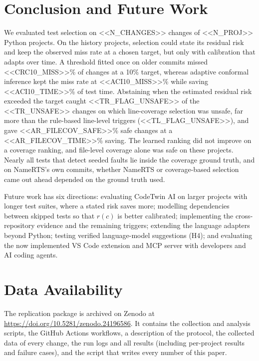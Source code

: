 \documentclass[conference]{IEEEtran}
\begin{document}
\section{Conclusion and Future Work}\label{sec:conclusion}
We evaluated test selection on <<N_CHANGES>> changes of <<N_PROJ>> Python projects. On the history projects, selection could state its residual risk and keep the observed miss rate at a chosen target, but only with calibration that adapts over time. A threshold fitted once on older commits missed <<CRC10_MISS>>\% of changes at a 10\% target, whereas adaptive conformal inference kept the miss rate at <<ACI10_MISS>>\% while saving <<ACI10_TIME>>\% of test time. Abstaining when the estimated residual risk exceeded the target caught <<TR_FLAG_UNSAFE>> of the <<TR_UNSAFE>> changes on which line-coverage selection was unsafe, far more than the rule-based line-level triggers (<<TL_FLAG_UNSAFE>>), and gave <<AR_FILECOV_SAFE>>\% safe changes at a <<AR_FILECOV_TIME>>\% saving. The learned ranking did not improve on a coverage ranking, and file-level coverage alone was safe on these projects. Nearly all tests that detect seeded faults lie inside the coverage ground truth, and on NameRTS's own commits, whether NameRTS or coverage-based selection came out ahead depended on the ground truth used.

Future work has six directions: evaluating CodeTwin AI on larger projects with longer test suites, where a stated risk saves more; modelling dependencies between skipped tests so that $r(c)$ is better calibrated; implementing the cross-repository evidence and the remaining triggers; extending the language adapters beyond Python; testing verified language-model suggestions (H4); and evaluating the now implemented VS Code extension and MCP server with developers and AI coding agents.

\section*{Data Availability}
The replication package is archived on Zenodo at \url{https://doi.org/10.5281/zenodo.24196586}. It contains the collection and analysis scripts, the GitHub Actions workflows, a description of the protocol, the collected data of every change, the run logs and all results (including per-project results and failure cases), and the script that writes every number of this paper.
\end{document}
